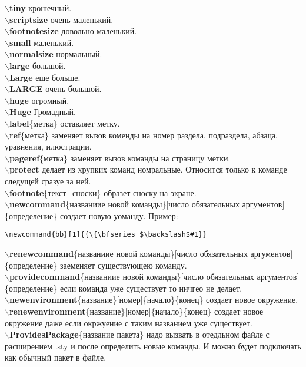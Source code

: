 \documentclass{article}
\newcommand{\bb}[1]{{\bfseries $\backslash$#1}} %
\begin{document}
\bb{tiny} {\tiny крошечный}.\\
\bb{scriptsize} {\scriptsize очень маленький}.\\
\bb{footnotesize} {\footnotesize довольно маленький}.\\
\bb{small} {\small маленький}.\\
\bb{normalsize} {\normalsize нормальный}.\\
\bb{large} {\large большой}.\\
\bb{Large} {\Large еще больше}.\\
\bb{LARGE} {\LARGE очень большой}.\\
\bb{huge} {\huge огромный}.\\
\bb{Huge} {\Huge Громадный}.\\

\bb{label}\{метка\} оставляет метку.\\
\bb{ref}\{метка\} заменяет вызов коменды на номер раздела, подраздела, абзаца, уравнения, илюстрации.\\
\bb{pageref}\{метка\} заменяет вызов команды на страницу метки.\\

\bb{protect} делает из хрупких команд номральные. Относится только к команде следущей сразуе за ней.\\

\bb{footnote}\{текст\_сноски\} образет сноску на экране.\\

\bb{newcommand}\{названиие новой команды\}[число обязательных аргументов]\{определение\} создает новую уоманду. Пример:
\begin{verbatim}
\newcommand{bb}[1]{{\{\bfseries $\backslash$#1}}
\end{verbatim} 
\bb{renewcommand}\{названиие новой команды\}[число обязательных аргументов]\{определение\} заеменяет существующею команду.\\
\bb{providecommand}\{названиие новой команды\}[число обязательных аргументов]\{определение\} если команда уже существует то ничгео не делает.\\

\bb{newenvironment}\{название\}[номер]\{начало\}\{конец\} создает новое окружение.\\
\bb{renewenvironment}\{название\}[номер]\{начало\}\{конец\} создает новое окружение даже если окржуение с таким названием уже существует.\\

\bb{ProvidesPackage}\{название пакета\} надо вызвать в отедльном файле с расширением .sty и после определить новые команды. И можно будет подключать как обычный пакет в файле.\\
\end{document}
